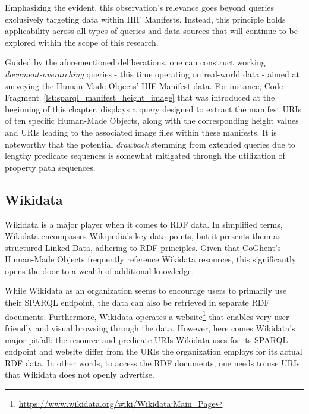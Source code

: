 Emphasizing the evident, this observation's relevance goes beyond queries exclusively targeting data within IIIF Manifests. Instead, this principle holds applicability across all types of queries and data sources that will continue to be explored within the scope of this research.

Guided by the aforementioned deliberations, one can construct working \textit{document-overarching} queries - this time operating on real-world data - aimed at surveying the Human-Made Objects' IIIF Manifest data. For instance, Code Fragment~\ref{lst:sparql_manifest_height_image} that was introduced at the beginning of this chapter, displays a query designed to extract the manifest URIs of ten specific Human-Made Objects, along with the corresponding height values and URIs leading to the associated image files within these manifests. It is noteworthy that the potential \textit{drawback} stemming from extended queries due to lengthy predicate sequences is somewhat mitigated through the utilization of property path sequences.

\subsection{Wikidata}

Wikidata is a major player when it comes to RDF data. In simplified terms, Wikidata encompasses Wikipedia's key data points, but it presents them as structured Linked Data, adhering to RDF principles. Given that CoGhent's Human-Made Objects frequently reference Wikidata resources, this significantly opens the door to a wealth of additional knowledge. \citep{vanveen2019wikidata}

While Wikidata as an organization seems to encourage users to primarily use their SPARQL endpoint, the data can also be retrieved in separate RDF documents. Furthermore, Wikidata operates a website\footnote{\url{https://www.wikidata.org/wiki/Wikidata:Main_Page}} that enables very user-friendly and visual browsing through the data. However, here comes Wikidata's major pitfall: the resource and predicate URIs Wikidata uses for its SPARQL endpoint and website differ from the URIs the organization employs for its actual RDF data. In other words, to access the RDF documents, one needs to use URIs that Wikidata does not openly advertise. \citep{wikidata2023data}

